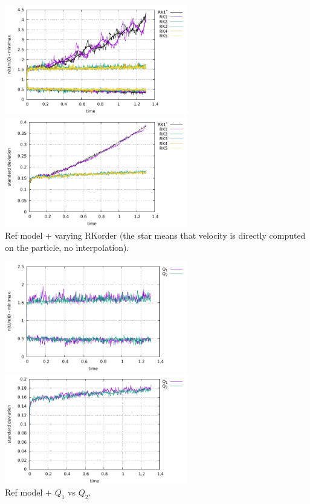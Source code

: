 \begin{center}
\includegraphics[width=8cm]{python_codes/fieldstone_30/results_box/markercount_rk12345}
\includegraphics[width=8cm]{python_codes/fieldstone_30/results_box/stdev_rk12345}\\
{\captionfont Ref model + varying RKorder (the star means that velocity 
is directly computed on the particle, no interpolation).}
\end{center} 

\begin{center}
\includegraphics[width=8cm]{python_codes/fieldstone_30/results_box/markercount_q12}
\includegraphics[width=8cm]{python_codes/fieldstone_30/results_box/stdev_q12}\\
{\captionfont Ref model + $Q_1$ vs $Q_2$. }
\end{center}

